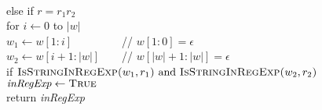 \documentclass[11pt]{article}
\begin{document}
\begin{solution}
\begin{enumerate}[(a)]
\begin{algo}
\\	else if $r=r_1r_2$\+
\\	for $i\gets 0$ to $|w|$\+
\\	$w_1\gets w[1:i]\,\,\,\,\,\,\,\,\,\,\,\,\,\,\,\,\,\,\,\,\,\,\,\,\,$ // $w[1:0]=\epsilon$
\\	$w_2\gets w[i+1:|w|]\,\,\,\,\,\,\,\,\,\,$ // $w[|w|+1:|w|]=\epsilon$
\\	if $\textsc{IsStringInRegExp($w_1, r_1$)} \text{ and } \textsc{IsStringInRegExp($w_2, r_2$)}$\+
\\	$\emph{inRegExp}\gets \textsc{True}$\-\-\-
\\	return \emph{inRegExp}
\end{algo}
\end{enumerate}
\end{solution}
\end{document}
